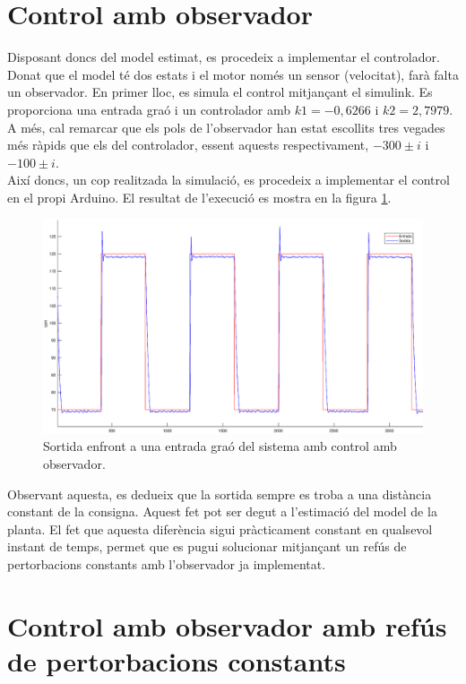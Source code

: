 \documentclass[]{article}
\begin{document}
\section{Control amb observador}

Disposant doncs del model estimat, es procedeix a implementar el controlador. Donat que el model té dos estats i el motor només un sensor (velocitat), farà falta un observador. En primer lloc, es simula el control mitjançant el simulink. Es proporciona una entrada graó i un controlador amb $k1=-0,6266$ i $k2=2,7979$. A més, cal remarcar que els pols de l'observador han estat escollits tres vegades més ràpids que els del controlador, essent aquests respectivament,  $-300 \pm i$ i  $-100 \pm i$. \\

Així doncs, un cop realitzada la simulació, es procedeix a implementar el control en el propi Arduino. El resultat de l'execució es mostra en la figura \ref{fig:observador}.

\begin{figure}[H]
\centering
	\includegraphics[width = .8\linewidth]{images/Entrada_Sortida_Observador.eps}
	\caption{Sortida enfront a una entrada graó del sistema amb control amb observador.}
	\label{fig:observador}
\end{figure}

Observant aquesta, es dedueix que la sortida sempre es troba a una distància constant de la consigna. Aquest fet pot ser degut a l'estimació del model de la planta. El fet que aquesta diferència sigui pràcticament constant en qualsevol instant de temps, permet que es pugui solucionar mitjançant un refús de pertorbacions constants amb l'observador ja implementat. 

\section{Control amb observador amb refús de pertorbacions constants}
\end{document}
